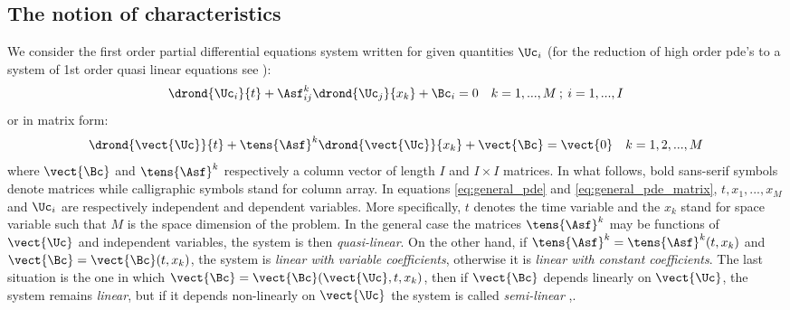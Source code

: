 \subsection{The notion of characteristics}
\cite[p.55]{Courant}
We consider the first order partial differential equations system written for given quantities $\Uc_i$ (for the reduction of high order pde's to a system of 1st order quasi linear equations see \cite[Chapter~1 -- Section~7 -- p.40]{Courant}):
\begin{equation}
  \label{eq:general_pde}
  \drond{\Uc_i}{t} + \Asf^k_{ij}\drond{\Uc_j}{x_k} + \Bc_i= 0 \quad k=1,...,M \:;\: i=1,...,I
\end{equation}
or in matrix form:
\begin{equation}
  \label{eq:general_pde_matrix}
  \drond{\vect{\Uc}}{t} + \tens{\Asf}^k \drond{\vect{\Uc}}{x_k} + \vect{\Bc} = \vect{0}\quad k=1,2,...,M
\end{equation}
where $\vect{\Bc}$ and $\tens{\Asf}^k$ respectively a column vector of length $I$ and $I\times I$ matrices. In what follows, bold sans-serif symbols denote matrices while calligraphic symbols stand for column array. In equations \ref{eq:general_pde} and \ref{eq:general_pde_matrix}, $t,x_1,...,x_M$ and $\Uc_i$ are respectively independent and dependent variables. More specifically, $t$ denotes the time variable and the $x_k$ stand for space variable such that $M$ is the space dimension of the problem. In the general case the matrices $\tens{\Asf}^k$ may be functions of $\vect{\Uc}$ and independent variables, the system is then \textit{quasi-linear}. On the other hand, if $\tens{\Asf}^k=\tens{\Asf}^k(t,x_k)$ and $\vect{\Bc}=\vect{\Bc}(t,x_k)$, the system is \textit{linear with variable coefficients}, otherwise it is \textit{linear with constant coefficients}. The last situation is the one in which $\vect{\Bc}=\vect{\Bc}(\vect{\Uc},t,x_k)$, then if $\vect{\Bc}$ depends linearly on $\vect{\Uc}$, the system remains \textit{linear}, but if it depends non-linearly on $\vect{\Uc}$ the system is called \textit{semi-linear} \cite[Chapter~5]{Courant},\cite[Chapter~2]{Toro}.

